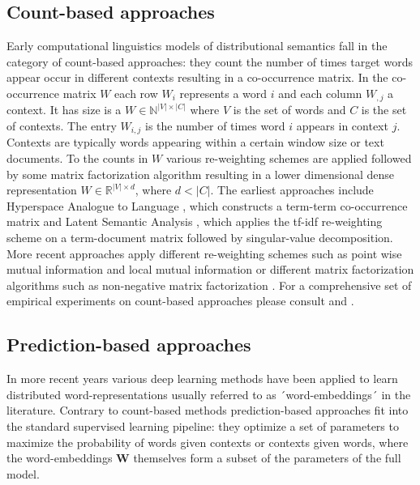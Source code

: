 \subsection{Count-based approaches}
\label{sec:count}
Early computational linguistics models of distributional semantics fall in the category of
count-based approaches: they count the number of times target words appear occur in different
contexts resulting in a co-occurrence matrix. In the co-occurrence matrix
$W$ each row $W_i$ represents a word $i$ and each column $W_{,j}$ a context. It has size
is a $W \in \mathbb{N}^{|V| \times |C|}$ where $V$ is the set of words and $C$ is
the set of contexts.
The entry $W_{i,j}$ is the number of times word $i$ appears in context $j$.
Contexts are typically words appearing within a certain window size or text documents.
To the counts in $W$ various re-weighting schemes are applied followed by some matrix factorization algorithm
resulting in a lower dimensional dense representation $W \in \mathbb{R}^{|V| \times d}$, where $d < |C|$.
The earliest approaches include Hyperspace Analogue to Language \citep{lund1996producing},
which constructs a term-term co-occurrence matrix and Latent Semantic Analysis \citep{dumais2004latent},
which applies the tf-idf re-weighting scheme on a term-document matrix followed by singular-value decomposition.
More recent approaches apply different re-weighting schemes such as point wise mutual information and local mutual
information \citep{evert2005statistics} or different matrix factorization algorithms such as non-negative
matrix factorization \citep{baroni2014don}. For a comprehensive set of empirical experiments on count-based
approaches please consult \cite{bullinaria2007extracting} and \cite{bullinaria2012extracting}.

\subsection{Prediction-based approaches}
\label{sec:pred}
In more recent years
various deep learning methods have been applied to learn distributed word-representations usually referred to
as ´word-embeddings´ in the literature. Contrary to count-based methods prediction-based approaches fit into the
standard supervised learning pipeline: they optimize a set of parameters to maximize the probability of words
given contexts or contexts given words, where the word-embeddings $\mathbf{W}$
themselves form a subset of the parameters of the full model.

